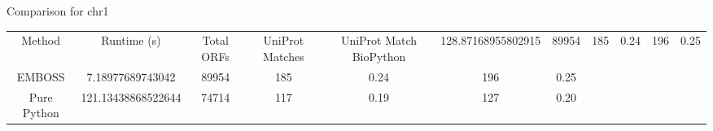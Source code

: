 Comparison for chr1
\begin{tabular}{ccccccc}
Method & Runtime (s) & Total ORFs & UniProt Matches & UniProt Match %
BioPython & 128.87168955802915 & 89954 & 185 & 0.24 & 196 & 0.25 \\
EMBOSS & 7.18977689743042 & 89954 & 185 & 0.24 & 196 & 0.25 \\
Pure Python & 121.13438868522644 & 74714 & 117 & 0.19 & 127 & 0.20 \\
\end{tabular}